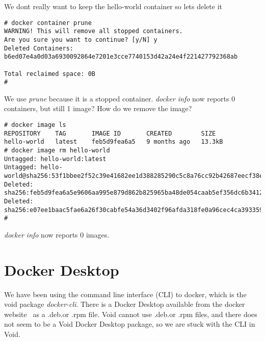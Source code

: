 \documentclass{article}  %
\begin{document}
 We dont really want to keep the hello-world container so lets delete it
\begin{verbatim}
# docker container prune
WARNING! This will remove all stopped containers.
Are you sure you want to continue? [y/N] y
Deleted Containers:
b6ed07e4a0d03a6930092864e7201e3cce7740153d42a24e4f221427792368ab

Total reclaimed space: 0B
# 
\end{verbatim}
We use {\em prune} because it is a stopped container. {\em docker info} now reports 0 containers, but still 1 image? How do we remove the image?
\begin{verbatim}
# docker image ls
REPOSITORY    TAG       IMAGE ID       CREATED        SIZE
hello-world   latest    feb5d9fea6a5   9 months ago   13.3kB
# docker image rm hello-world
Untagged: hello-world:latest
Untagged: hello-world@sha256:53f1bbee2f52c39e41682ee1d388285290c5c8a76cc92b42687eecf38e0af3f0
Deleted: sha256:feb5d9fea6a5e9606aa995e879d862b825965ba48de054caab5ef356dc6b3412
Deleted: sha256:e07ee1baac5fae6a26f30cabfe54a36d3402f96afda318fe0a96cec4ca393359
# 
\end{verbatim}
{\em docker info} now reports 0 images. 

\section{Docker Desktop}
We have been using the command line interface (CLI) to docker, which is the void package {\em docker-cli}. There is a Docker Desktop available from the docker website~\cite{dock:01} as a .deb.or .rpm file.  Void cannot use .deb.or .rpm files, and there does not seem to be a Void Docker Desktop package, so we are stuck with the CLI in Void.
\end{document}
